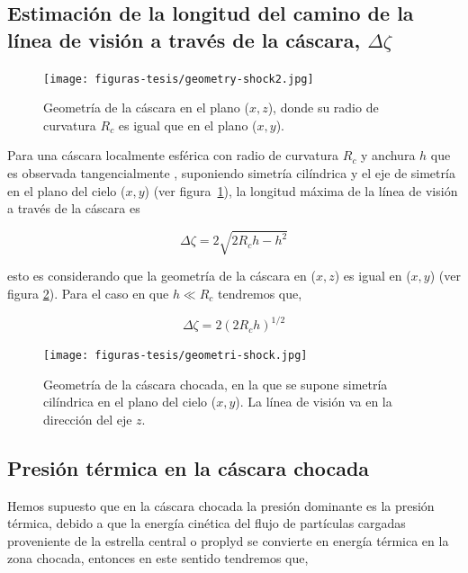 \subsection{Estimación de la longitud del camino de la línea de visión a través de la cáscara, \(\Delta \zeta\)}
\label{sec:camino}

\begin{figure}
  \centering
  \texttt{[image: figuras-tesis/geometry-shock2.jpg]}
  \caption{Geometría de la cáscara en el plano (\(x, z\)), donde su radio de curvatura \(R_{c}\) es igual que en el plano (\(x, y\)).}
  \label{fig:geometria1}
\end{figure}


Para una cáscara localmente esférica con radio de curvatura \(R_{c}\) y anchura \(h\) que es observada tangencialmente \citep{Henney:2013a}, suponiendo simetría cilíndrica y el eje de simetría en el plano del cielo (\(x, y\)) (ver figura~\ref{fig:geometria1}), la longitud máxima de la línea de visión a través de la cáscara es


\begin{equation}
  \label{eq:line-singht}
   \Delta \zeta = 2\sqrt{2R_{c}h -h^{2}}
\end{equation}

 esto es considerando que la geometría de la cáscara en (\(x, z\)) es igual en (\(x, y\)) (ver figura  \ref{fig:geometria}). Para el caso en que \(h \ll R_{c}\) tendremos que,

\begin{equation}
  \label{eq:vision}
  \Delta \zeta = 2(2R_{c}h)^{1/2}
\end{equation}

\begin{figure}
  \centering
  \texttt{[image: figuras-tesis/geometri-shock.jpg]}
  \caption{Geometría de la cáscara chocada, en la que se supone simetría cilíndrica en el plano del cielo (\(x, y\)). La línea de visión va en la dirección del eje \(z\).}
  \label{fig:geometria}
\end{figure}


\subsection{Presión térmica en la cáscara chocada}
\label{sec:pressur-thermal}

Hemos supuesto que en la cáscara chocada la presión dominante es la presión térmica, debido a que la energía cinética del flujo de partículas cargadas proveniente de la estrella central o proplyd se convierte en energía térmica en la zona chocada, entonces en este sentido tendremos que,

